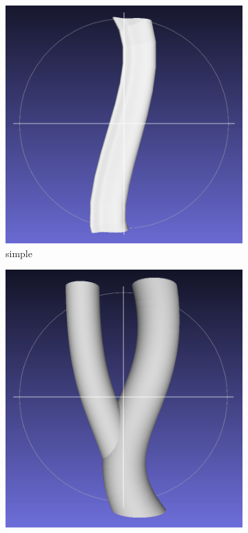 \documentclass[11p, titlepage]{article}
\begin{document}
\begin{figure}[h!]
     \centering
     \begin{subfigure}[b]{0.3\textwidth}
         \centering
         \includegraphics[width=\textwidth]{originals/simple}
         \caption{simple}
         \label{fig:simple}
     \end{subfigure}
     \hfill
     \begin{subfigure}[b]{0.3\textwidth}
         \centering
         \includegraphics[width=\textwidth]{originals/simple-branch}

\end{subfigure}
\end{figure}
\end{document}
